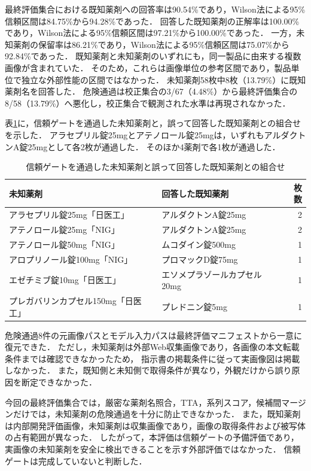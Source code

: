 \documentclass[uplatex,dvipdfmx]{jsarticle}
\begin{document}
最終評価集合における既知薬剤への回答率は90.54\%であり，Wilson法による95\%信頼区間は84.75\%から94.28\%であった．
回答した既知薬剤の正解率は100.00\%であり，Wilson法による95\%信頼区間は97.21\%から100.00\%であった．
一方，未知薬剤の保留率は86.21\%であり，Wilson法による95\%信頼区間は75.07\%から92.84\%であった．
既知薬剤と未知薬剤のいずれにも，同一製品に由来する複数画像が含まれていた．
そのため，これらは画像単位の参考区間であり，製品単位で独立な外部性能の区間ではなかった．
未知薬剤58枚中8枚（13.79\%）に既知薬剤名を回答した．
危険通過は校正集合の3/67（4.48\%）から最終評価集合の8/58（13.79\%）へ悪化し，校正集合で観測された水準は再現されなかった．

表\ref{tab:trust_gate_unsafe}に，信頼ゲートを通過した未知薬剤と，誤って回答した既知薬剤との組合せを示した．
アラセプリル錠25mgとアテノロール錠25mgは，いずれもアルダクトンA錠25mgとして各2枚が通過した．
そのほか4薬剤で各1枚が通過した．

\begin{table}[htbp]
  \centering
  \caption{信頼ゲートを通過した未知薬剤と誤って回答した既知薬剤との組合せ}
  \label{tab:trust_gate_unsafe}
  \small
  \begin{tabular}{|p{5.0cm}|p{5.0cm}|r|}
    \hline
    未知薬剤 & 回答した既知薬剤 & 枚数 \\ \hline
    アラセプリル錠25mg「日医工」 & アルダクトンA錠25mg & 2 \\ \hline
    アテノロール錠25mg「NIG」 & アルダクトンA錠25mg & 2 \\ \hline
    アテノロール錠50mg「NIG」 & ムコダイン錠500mg & 1 \\ \hline
    アロプリノール錠100mg「NIG」 & プロマックD錠75mg & 1 \\ \hline
    エゼチミブ錠10mg「日医工」 & エソメプラゾールカプセル20mg & 1 \\ \hline
    プレガバリンカプセル150mg「日医工」 & プレドニン錠5mg & 1 \\ \hline
  \end{tabular}
\end{table}

危険通過8件の元画像パスとモデル入力パスは最終評価マニフェストから一意に復元できた．
ただし，未知薬剤は外部Web収集画像であり，各画像の本文転載条件までは確認できなかったため，
指示書の掲載条件に従って実画像図は掲載しなかった．
また，既知側と未知側で取得条件が異なり，外観だけから誤り原因を断定できなかった．

今回の最終評価集合では，厳密な薬剤名照合，TTA，系列スコア，候補間マージンだけでは，未知薬剤の危険通過を十分に防止できなかった．
また，既知薬剤は内部開発評価画像，未知薬剤は収集画像であり，画像の取得条件および被写体の占有範囲が異なった．
したがって，本評価は信頼ゲートの予備評価であり，実画像の未知薬剤を安全に検出できることを示す外部評価ではなかった．
信頼ゲートは完成していないと判断した．
\end{document}

